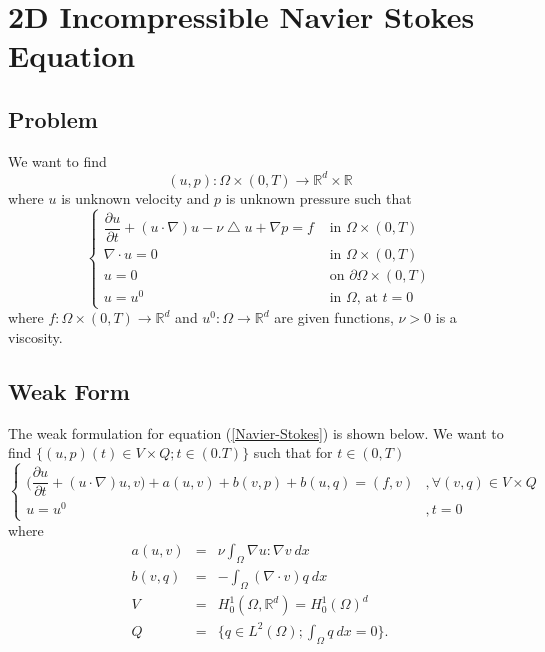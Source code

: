 \documentclass[a4paper,10pt]{article}
\newcommand{\R}{\mathbb{R}}
\begin{document}
\section{2D Incompressible Navier Stokes Equation}

\subsection{Problem}
We want to find \[(u,p) : \Omega \times (0,T) \rightarrow \R^d \times \R\] where $ u $ is unknown velocity and $ p $ is unknown pressure such that
\begin{equation}\label{Navier-Stokes}
\begin{cases}
\dfrac{\partial u}{\partial t} + (u \cdot \nabla) u - \nu \bigtriangleup u + \nabla p = f & \text{ in } \Omega \times (0,T)\\
\nabla \cdot u = 0 & \text{ in } \Omega \times (0,T)\\
u = 0 & \text{ on } \partial \Omega \times (0,T)\\
u = u^0 & \text{ in } \Omega \text{, at } t=0
\end{cases}
\end{equation}
where $ f : \Omega \times (0,T) \rightarrow \R^d $ and $ u^0 : \Omega \rightarrow \R^d $ are given functions, $ \nu > 0 $ is a viscosity.

\subsection{Weak Form}
The weak formulation for equation (\ref{Navier-Stokes}) is shown below. We want to find $ \{ (u,p)(t) \in V \times Q ; t \in (0.T) \} $ such that for $ t \in (0,T) $
\begin{equation} \label{NS_Weak}
\begin{cases}
\big( \dfrac{\partial u}{\partial t} + (u \cdot \nabla)u,v \big) + a(u,v) + b(v,p) + b(u,q) = (f,v) & ,\forall(v,q)\in V\times Q \\ u=u^{0} & , t=0
\end{cases}
\end{equation}
where
\begin{eqnarray}\nonumber
a(u,v) &=& \nu \int_{\Omega} \nabla u : \nabla v \ dx \\ \nonumber
b(v,q) &=& - \int_{\Omega} (\nabla \cdot v) q \ dx \\ \nonumber
V &=& H_{0}^{1}(\Omega, \R^d) = H_{0}^{1}(\Omega)^d \\ \nonumber
Q &=& \{ q\in L^2(\Omega) ; \int_{\Omega} q \ dx=0 \}.
\end{eqnarray}
\end{document}
